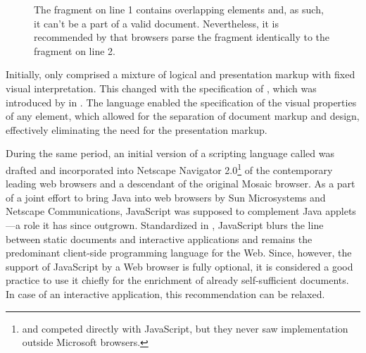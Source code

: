 \documentclass[
  a5paper,10pt,           %
  dvipsnames              %
]{book}
\begin{document}
\begin{figure}[b]
  \caption{The fragment on line 1 contains overlapping elements and, as such, it
    can't be a part of a valid  document. Nevertheless, it is
    recommended by  that browsers parse the fragment identically to
    the fragment on line 2.}
  \label{fig:overlapping-elements}
\end{figure}

Initially,  only comprised a mixture of logical and presentation
markup with fixed visual interpretation. This changed with the specification of
, which was introduced by  in \citeyear{lie96}. The
language enabled the specification of the visual properties of any element,
which allowed for the separation of document markup and design, effectively
eliminating the need for the presentation markup.

\begin{figure}
\end{figure}

During the same period, an initial version of a scripting language called
 \cite{ecma97} was drafted and incorporated into Netscape
Navigator 2.0\footnote{
   and  competed directly with JavaScript, but they
  never saw implementation outside Microsoft browsers.
} of the contemporary leading web browsers and a descendant of the original
Mosaic browser. As a part of a joint effort to bring Java into web browsers by
Sun Microsystems and Netscape Communications, JavaScript was supposed to
complement Java applets \cite{netscape95}---a role it has since outgrown.
Standardized in \citeyear{ecma97}, JavaScript blurs the line between static
documents and interactive applications and remains the predominant client-side
programming language for the Web. Since, however, the support of JavaScript by a
Web browser is fully optional, it is considered a good practice to use it
chiefly for the enrichment of already self-sufficient  documents.
In case of an interactive application, this recommendation can be relaxed.
\end{document}
